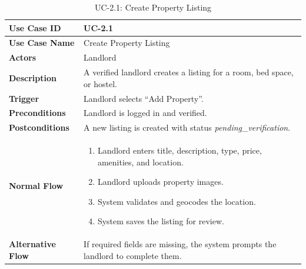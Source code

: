 \begin{table}[h]
\centering
\caption{UC-2.1: Create Property Listing}

\begin{tabularx}{\textwidth}{
|>{\raggedright\arraybackslash}p{3.5cm}
|>{\raggedright\arraybackslash}X|}

\hline
\textbf{Use Case ID} & UC-2.1 \\ \hline
\textbf{Use Case Name} & Create Property Listing \\ \hline
\textbf{Actors} & Landlord \\ \hline
\textbf{Description} & A verified landlord creates a listing for a room, bed space, or hostel. \\ \hline
\textbf{Trigger} & Landlord selects ``Add Property''. \\ \hline
\textbf{Preconditions} & Landlord is logged in and verified. \\ \hline
\textbf{Postconditions} & A new listing is created with status \textit{pending\_verification}. \\ \hline
\textbf{Normal Flow} &
\begin{enumerate}
    \item Landlord enters title, description, type, price, amenities, and location.
    \item Landlord uploads property images.
    \item System validates and geocodes the location.
    \item System saves the listing for review.
\end{enumerate}
\\ \hline
\textbf{Alternative Flow} &
If required fields are missing, the system prompts the landlord to complete them.
\\ \hline

\end{tabularx}

\end{table}

